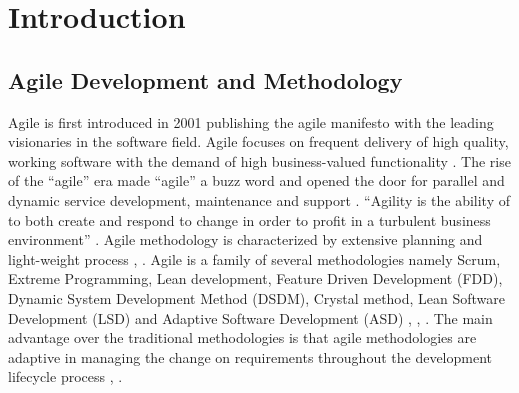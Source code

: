 \documentclass[a4paper,oneside]{bth}
\begin{document}
\chapter{Introduction} \label{introduction}
\section{Agile Development and Methodology}
Agile is first introduced in 2001 publishing the agile manifesto with the leading visionaries in the software field. Agile focuses on frequent delivery of high quality, working software with the demand of high business-valued functionality \cite{fowler_agile_2001}. The rise of the “agile” era made “agile” a buzz word and opened the door for parallel and dynamic service development, maintenance and support \cite{jigeesh_empirical_2015}. “Agility is the ability of to both create and respond to change in order to profit in a turbulent business environment” \cite{patel_agile_2009}. Agile methodology is characterized by extensive planning and light-weight process \cite{qumer_framework_2008}, \cite{sidky_structured_2007}. Agile is a family of several methodologies namely Scrum, Extreme Programming, Lean development, Feature Driven Development (FDD), Dynamic System Development Method (DSDM), Crystal method, Lean Software Development (LSD) and Adaptive Software Development (ASD) , \cite{ambler_agile_2009}, \cite{hislop_integrating_2002}. The main advantage over the traditional methodologies is that agile methodologies are adaptive in managing the change on requirements throughout the development lifecycle process \cite{al_tamimi_empirical_2014}, \cite{fowler_agile_2001}.
\end{document}
